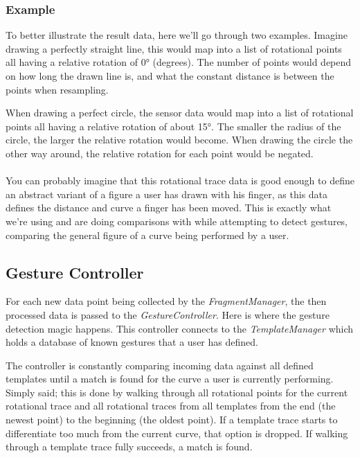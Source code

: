 \documentclass{standalone}
\begin{document}
  \subsubsection{Example}
  To better illustrate the result data, here we'll go through two examples.
  Imagine drawing a perfectly straight line, this would map into a list of
  rotational points all having a relative rotation of 0\si{\degree} (degrees). The number of
  points would depend on how long the drawn line is, and what the constant
  distance is between the points when resampling.

  When drawing a perfect circle, the sensor data would map into a list of
  rotational points all having a relative rotation of about 15\si{\degree}. The
  smaller the radius of the circle, the larger the relative rotation would
  become. When drawing the circle the other way around, the relative rotation
  for each point would be negated.

  \paragraph{}
  You can probably imagine that this rotational trace data is good enough to
  define an abstract variant of a figure a user has drawn with his
  finger, as this data defines the distance and curve a finger has been moved.
  This is exactly what we're using and are doing comparisons with while
  attempting to detect gestures, comparing the general figure of a curve being
  performed by a user.

  \subsection{Gesture Controller}
  For each new data point being collected by the \emph{FragmentManager}, the
  then processed data is passed to the \emph{GestureController}. Here is where
  the gesture detection magic happens. This controller connects to the
  \emph{TemplateManager} which holds a database of known gestures that a user
  has defined.

  The controller is constantly comparing incoming data against all
  defined templates until a match is found for the curve a user is currently
  performing. Simply said; this is done by walking through all rotational points
  for the current rotational trace and all rotational traces from all templates
  from the end (the newest point) to the beginning (the oldest point). If a
  template trace starts to differentiate too much from the current curve, that
  option is dropped. If walking through a template trace fully succeeds, a
  match is found.
\end{document}
